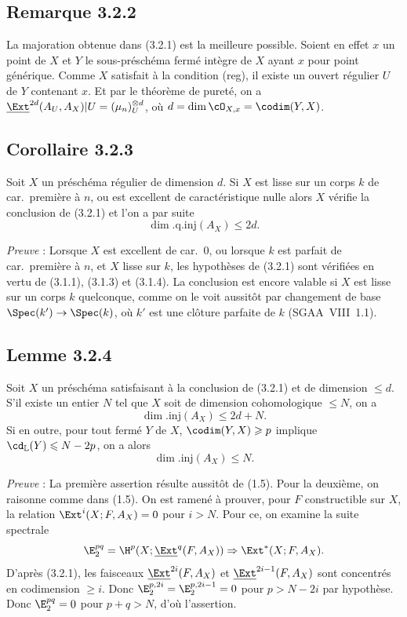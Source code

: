 \subsection*{Remarque 3.2.2}
La majoration obtenue dans (3.2.1) est la meilleure possible. Soient en effet $x$ un point de $X$ et $Y$ le sous-préschéma fermé intègre de $X$ ayant $x$ pour point générique. Comme $X$ satisfait à la condition (reg), il existe un ouvert régulier $U$ de $Y$
contenant $x$. Et par le théorème de 
pureté, on a $\underline{\Ext}^{2d}(A_U, A_X)|U = (\mu_n)^{\otimes d}_U$, où $d = \dim \cO_{X,x} = \codim(Y,X)$.

\subsection*{Corollaire 3.2.3}
Soit $X$ un préschéma régulier de dimension $d$. Si $X$ est lisse sur un corps $k$ de car.~première à $n$, ou est excellent de caractéristique nulle alors $X$ vérifie la conclusion de (3.2.1) et l'on a par suite
\[
\dim.\mathrm{q.inj}(A_X) \leqslant 2d.
\]

\emph{Preuve} : Lorsque $X$ est excellent de car.~0, ou lorsque $k$ est parfait de car.~première à $n$, et $X$ lisse sur $k$, les hypothèses de (3.2.1) sont vérifiées en vertu de (3.1.1), (3.1.3) et (3.1.4). La conclusion est encore valable si $X$ est lisse sur un corps $k$ quelconque, comme on le voit aussitôt par changement de base $\Spec(k') \to \Spec(k)$, où $k'$ est une clôture parfaite de $k$ (SGAA~VIII~1.1).

\subsection*{Lemme 3.2.4}
Soit $X$ un préschéma satisfaisant à la conclusion de (3.2.1) et de dimension $\leqslant d$. S'il existe un entier $N$ tel que $X$ soit de dimension cohomologique $\leqslant N$, on a
\[
\dim.\mathrm{inj}(A_X) \leqslant 2d + N.
\]
Si en outre, pour tout fermé $Y$ de $X$, $\codim(Y,X) \geqslant p$ implique $\cd_{\mathbb{L}}(Y) \leqslant N - 2p$, on a alors
\[
\dim.\mathrm{inj}(A_X) \leqslant N.
\]

\emph{Preuve} : La première assertion résulte aussitôt de (1.5). Pour la deuxième, on raisonne comme dans (1.5). On est ramené à prouver, pour $F$ constructible sur $X$, la relation $\Ext^i(X; F, A_X) = 0$ pour $i > N$. Pour ce, on examine la suite spectrale
\[
\E_2^{pq} = \H^p(X; \underline{\Ext}^q(F, A_X)) \Rightarrow \Ext^{*}(X; F, A_X).
\]
D'après (3.2.1), les
faisceaux $\underline{\Ext}^{2i}(F, A_X)$ et $\underline{\Ext}^{2i-1}(F, A_X)$ sont concentrés en codimension $\geqslant i$. Donc $\E_2^{p,2i} = \E_2^{p,2i-1} = 0$ pour $p > N - 2i$ par hypothèse. Donc $\E_2^{pq} = 0$ pour $p+q > N$, d'où l'assertion.

